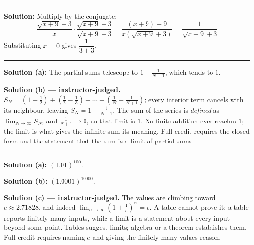 \documentclass[12pt]{article}
\begin{document}
\vspace{0.15cm}\noindent\rule{\linewidth}{0.2pt}\vspace{0.15cm}


\textbf{Solution:} \quad Multiply by the conjugate:
\[ \frac{\sqrt{x+9}-3}{x}\cdot\frac{\sqrt{x+9}+3}{\sqrt{x+9}+3}
 = \frac{(x+9)-9}{x\left(\sqrt{x+9}+3\right)} = \frac{1}{\sqrt{x+9}+3} \]
Substituting $x = 0$ gives $\dfrac{1}{3+3}$. 

\vspace{0.15cm}\noindent\rule{\linewidth}{0.2pt}\vspace{0.15cm}


\textbf{Solution (a):} \quad The partial sums telescope to $1 - \frac{1}{N+1}$, which tends to
$1$. 

\textbf{Solution (b) --- instructor-judged.} \quad
$S_N = \left(1-\frac12\right)+\left(\frac12-\frac13\right)+\cdots+\left(\frac1N-\frac1{N+1}\right)$;
every interior term cancels with its neighbour, leaving $S_N = 1 - \frac{1}{N+1}$. The sum of
the series is \emph{defined} as $\lim_{N\to\infty} S_N$, and $\frac{1}{N+1} \to 0$, so that
limit is $1$. No finite addition ever reaches $1$; the limit is what gives the infinite sum its
meaning. Full credit requires the closed form and the statement that the sum is a limit of
partial sums.

\vspace{0.15cm}\noindent\rule{\linewidth}{0.2pt}\vspace{0.15cm}


\textbf{Solution (a):} \quad $\left(1.01\right)^{100}$. 

\textbf{Solution (b):} \quad $\left(1.0001\right)^{10000}$. 

\textbf{Solution (c) --- instructor-judged.} \quad The values are climbing toward
$e \approx 2.71828$, and indeed $\lim_{n\to\infty}\left(1+\frac1n\right)^n = e$. A table cannot
prove it: a table reports finitely many inputs, while a limit is a statement about every input
beyond some point. Tables suggest limits; algebra or a theorem establishes them. Full credit
requires naming $e$ and giving the finitely-many-values reason.
\end{document}

